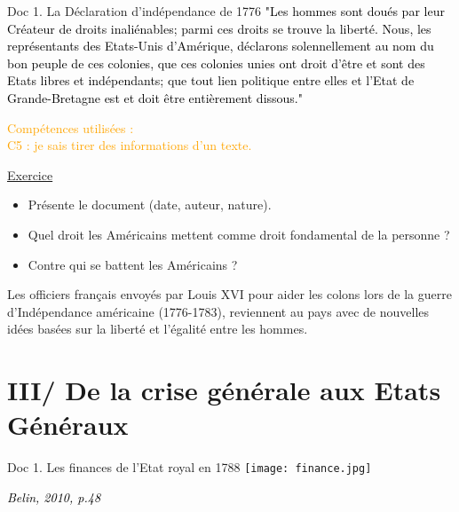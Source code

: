 \documentclass{beamer}
\begin{document}
\begin{frame}
\begin{beamerboxesrounded}[scheme=blocimage]{Doc 1. La Déclaration d'indépendance de 1776}
\textcolor{black}{
"Les hommes sont doués par leur Créateur de droits inaliénables; parmi ces droits se trouve la liberté. Nous, les représentants des Etats-Unis d'Amérique, déclarons solennellement au nom du bon peuple de ces colonies, que ces colonies unies ont droit d'être et sont des Etats libres et indépendants; que tout lien politique entre elles et l'Etat de Grande-Bretagne est et doit être entièrement dissous."}
\end{beamerboxesrounded}
\end{frame}

\begin{frame}
\begin{flushright}
{\tiny \textcolor{orange}{Compétences utilisées : \\
C5 : je sais tirer des informations d'un texte.}}
\end{flushright}
\underline{Exercice}
\begin{itemize}
\item Présente le document (date, auteur, nature).
\item Quel droit les Américains mettent comme droit fondamental de la personne ?
\item Contre qui se battent les Américains ?
\end{itemize}
\end{frame}

\begin{frame}
\setlength{\parindent}{1cm} Les officiers français envoyés par Louis XVI pour aider les colons lors de la guerre d'Indépendance américaine (1776-1783), reviennent au pays avec de nouvelles idées basées sur la liberté et l'égalité entre les hommes.
\end{frame}

\section{III/ De la crise générale aux Etats Généraux}
\begin{frame}
\begin{beamerboxesrounded}[scheme=blocimage]{Doc 1. Les finances de l'Etat royal en 1788}
\texttt{[image: finance.jpg]}
\begin{flushright}
\textcolor{black}{\small \textit{Belin, 2010, p.48}}
\end{flushright}
\end{beamerboxesrounded}
\end{frame}
\end{document}
